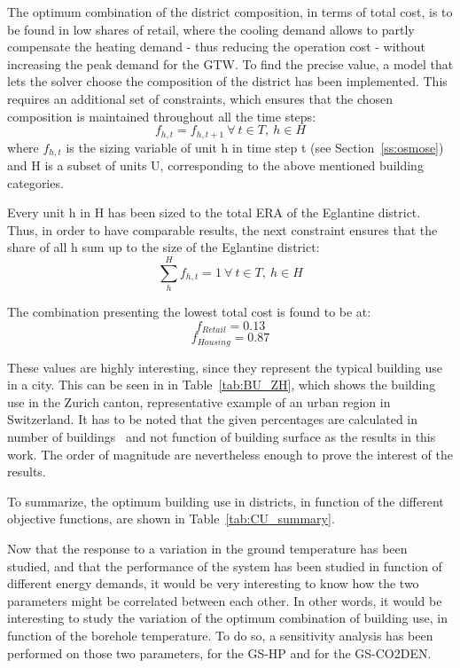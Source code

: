 \documentclass{article}
\begin{document}
The optimum combination of the district composition, in terms of total cost, is to be found in low shares of retail, where the cooling demand allows to partly compensate the heating demand - thus reducing the operation cost - without increasing the peak demand for the GTW. To find the precise value, a model that lets the solver choose the composition of the district has been implemented. This requires an additional set of constraints, which ensures that the chosen composition is maintained throughout all the time steps:
\begin{equation}
f_{h,t} = f_{h,t+1} \ \forall \ t \in T, \ h \in H
\end{equation}
where $f_{h,t}$ is the sizing variable of unit h in time step t (see Section~\ref{ss:osmose}) and H is a subset of units U, corresponding to the above mentioned building categories.

Every unit h in H has been sized to the total ERA of the Eglantine district. Thus, in order to have comparable results, the next constraint ensures that the share of all h sum up to the size of the Eglantine district:
\begin{equation}
\sum_{h}^{H} f_{h,t} = 1 \ \forall \ t \in T, \ h \in H
\end{equation}

The combination presenting the lowest total cost is found to be at:
$$f_{Retail} = 0.13 $$
$$f_{Housing} = 0.87 $$

These values are highly interesting, since they represent the typical building use in a city. This can be seen in in Table~\ref{tab:BU_ZH}, which shows the building use in the Zurich canton, representative example of an urban region in Switzerland. It has to be noted that the given percentages are calculated in number of buildings~\cite{endk-konferenzkantonalerenergiedirektorenEnergieverbrauchGebaudenFact2014} and not function of building surface as the results in this work. The order of magnitude are nevertheless enough to prove the interest of the results.



To summarize, the optimum building use in districts, in function of the different objective functions, are shown in Table~\ref{tab:CU_summary}.



Now that the response to a variation in the ground temperature has been studied, and that the performance of the system has been studied in function of different energy demands, it would be very interesting to know how the two parameters might be correlated between each other. In other words, it would be interesting to study the variation of the optimum combination of building use, in function of the borehole temperature. 
To do so, a sensitivity analysis has been performed on those two parameters, for the GS-HP and for the GS-CO2DEN. 
\end{document}
